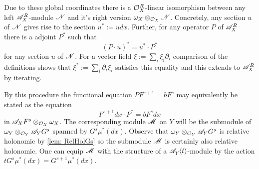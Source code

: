 Due to these global coordinates there is a $\mathcal{O}_X^R$-linear isomorphism between any left $\mathscr{A}_X^R$-module $\mathscr{N}$ and it's right version $\omega_X \otimes_{\mathcal{O}_X}\mathscr{N}$. Concretely, any section $u$ of $\mathscr{N}$ gives rise to the section $u^* := u dx$. Further, for any operator $P$ of $\mathscr{A}_X^R$ there is a adjoint $P^*$ such that
$$(P\cdot u)^* =   u^* \cdot P^*$$
for any section $u$ of $\mathscr{N}$. For a vector field $\xi := \sum_i\xi_i \partial_i$ comparison of the definitions shows that $\xi^* := \sum_i\partial_i\xi_i$ satisfies this equality and this extends to $\mathscr{A}_X^R$ by iterating.

By this procedure the functional equation $P F^{s+1} = b F^s$ may equivalently be stated as the equation
$$F^{s+1}dx \cdot P^* = b F^s dx $$
in $\mathscr{A}_X F^s \otimes_{\mathcal{O}_X}\omega_X$.
The corresponding module $\mathscr{M}$ on $Y$ will be the submodule of $\omega_Y\otimes_{\mathcal{O}_Y} \mathscr{A}_Y G^s$ spanned by $G^s \mu^*(dx)$.
Observe that $\omega_Y\otimes_{\mathcal{O}_Y} \mathscr{A}_Y G^s$ is relative holonomic by \cref{lem: RelHolGs} so the submodule $\mathscr{M}$ is certainly also relative holonomic.
One can equip $\mathscr{M}$ with the structure of a $\mathscr{A}_{Y}^{}\mkern-5mu\left\langle t \right\rangle$-module by the action $t G^s \mu^*(dx) = G^{s+1} \mu^*(dx)$.

